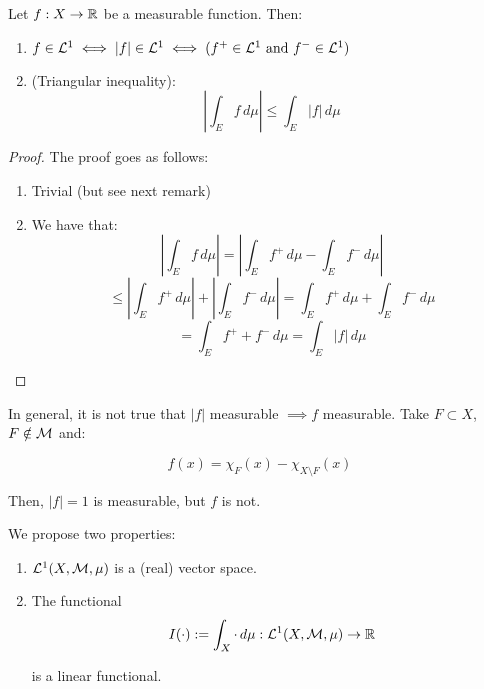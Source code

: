 \begin{fproposition}
    Let $f: X \to \mathbb{R}$ be a measurable function. Then:
    \vspace{1em}
    \begin{enumerate}[label=(\roman*)]
        \item $f \in \mathcal{L}^1 \iff |f| \in \mathcal{L}^1 \iff (f^+ \in \mathcal{L}^1 \text{ and } f^- \in \mathcal{L}^1)$
        \vspace{1em}

        \item (Triangular inequality):
        $$\left|\int_{E} f \, d\mu\right| \leq \int_{E} |f| \, d\mu$$
    \end{enumerate}
\end{fproposition}

\begin{proof}
    The proof goes as follows:
    \begin{enumerate}[label=(\roman*)]
        \item Trivial (but see next remark)
        
        \item We have that:
        $$\left|\int_{E} f \, d\mu\right| = \left|\int_{E} f^+ \, d\mu - \int_{E} f^- \, d\mu\right|$$
        $$\leq \left|\int_{E} f^+ \, d\mu\right| + \left|\int_{E} f^- \, d\mu\right| = \int_{E} f^+ \, d\mu + \int_{E} f^- \, d\mu$$
        $$= \int_{E} f^+ + f^- \, d\mu = \int_{E} |f| \, d\mu$$

        \end{enumerate}
\end{proof}

\begin{fremark}
    In general, it is not true that $|f|$ measurable $\implies f$ measurable. 
    Take $F \subset X$, $F \notin \mathcal{M}$ and:

    $$f(x) = \chi_F(x) - \chi_{X \setminus F}(x)$$

    Then, $|f| = 1$ is measurable, but $f$ is not.
\end{fremark}

\vspace{1em}

\begin{fproposition}
    We propose two properties:
    \vspace{1em}
    \begin{enumerate}[label=(\roman*)]
        \item $\mathcal{L}^1(X, \mathcal{M}, \mu)$ is a (real) vector space.
        \vspace{1em}

        \item The functional 
        $$I(\cdot) := \int_{X} \cdot \, d\mu: \mathcal{L}^1(X, \mathcal{M}, \mu) \to \mathbb{R}$$
        
        is a linear functional.
    \end{enumerate}
\end{fproposition}

